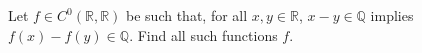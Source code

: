 \begin{problem}
    Let \( f \in C^0\left(\mathbb{R},\mathbb{R}\right) \) be such that, for all \( x, y \in \mathbb{R} \), \( x-y \in \mathbb{Q} \) implies \( f\left(x\right)-f\left(y\right) \in \mathbb{Q} \). Find all such functions \( f \).
\end{problem}
